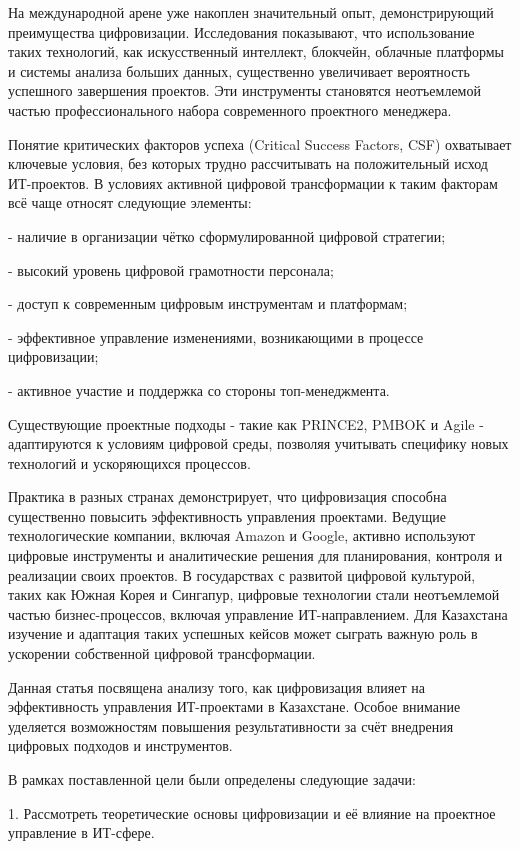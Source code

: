\begin{multicols}{2}
На международной арене уже накоплен значительный опыт, демонстрирующий
преимущества цифровизации. Исследования показывают, что использование
таких технологий, как искусственный интеллект, блокчейн, облачные
платформы и системы анализа больших данных, существенно увеличивает
вероятность успешного завершения проектов. Эти инструменты становятся
неотъемлемой частью профессионального набора современного проектного
менеджера.

Понятие критических факторов успеха (Critical Success Factors, CSF)
охватывает ключевые условия, без которых трудно рассчитывать на
положительный исход ИТ-проектов. В условиях активной цифровой
трансформации к таким факторам всё чаще относят следующие элементы:


- наличие в организации чётко сформулированной цифровой стратегии;

- высокий уровень цифровой грамотности персонала;

- доступ к современным цифровым инструментам и платформам;

- эффективное управление изменениями, возникающими в процессе
цифровизации;

- активное участие и поддержка со стороны топ-менеджмента.

Существующие проектные подходы - такие как PRINCE2, PMBOK и Agile -
адаптируются к условиям цифровой среды, позволяя учитывать специфику
новых технологий и ускоряющихся процессов.

Практика в разных странах демонстрирует, что цифровизация способна
существенно повысить эффективность управления проектами. Ведущие
технологические компании, включая Amazon и Google, активно используют
цифровые инструменты и аналитические решения для планирования, контроля
и реализации своих проектов. В государствах с развитой цифровой
культурой, таких как Южная Корея и Сингапур, цифровые технологии стали
неотъемлемой частью бизнес-процессов, включая управление
ИТ-направлением. Для Казахстана изучение и адаптация таких успешных
кейсов может сыграть важную роль в ускорении собственной цифровой
трансформации.

Данная статья посвящена анализу того, как цифровизация влияет на
эффективность управления ИТ-проектами в Казахстане. Особое внимание
уделяется возможностям повышения результативности за счёт внедрения
цифровых подходов и инструментов.

В рамках поставленной цели были определены следующие задачи:

1. Рассмотреть теоретические основы цифровизации и её влияние на
проектное управление в ИТ-сфере.


\end{multicols}
